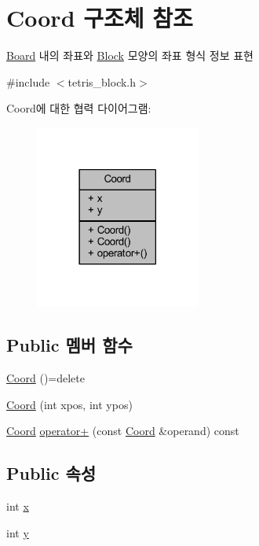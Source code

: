 \hypertarget{struct_coord}{}\section{Coord 구조체 참조}
\label{struct_coord}


\mbox{\hyperlink{class_board}{Board}} 내의 좌표와 \mbox{\hyperlink{class_block}{Block}} 모양의 좌표 형식 정보 표현  




{\ttfamily \#include $<$tetris\+\_\+block.\+h$>$}



Coord에 대한 협력 다이어그램\+:
\nopagebreak
\begin{figure}[H]
\begin{center}
\leavevmode
\includegraphics[width=153pt]{struct_coord__coll__graph}
\end{center}
\end{figure}
\subsection*{Public 멤버 함수}
\begin{DoxyCompactItemize}
\item 
\mbox{\hyperlink{struct_coord_a46e518631fa539ebb8a7f2a5b59fd483}{Coord}} ()=delete
\item 
\mbox{\hyperlink{struct_coord_ab01ff8e569cc417d7c669007e12a5fa1}{Coord}} (int xpos, int ypos)
\item 
\mbox{\hyperlink{struct_coord}{Coord}} \mbox{\hyperlink{struct_coord_ad564b77330c90986e1586d2d04aad6f9}{operator+}} (const \mbox{\hyperlink{struct_coord}{Coord}} \&operand) const
\end{DoxyCompactItemize}
\subsection*{Public 속성}
\begin{DoxyCompactItemize}
\item 
int \mbox{\hyperlink{struct_coord_a696eaa744360fc791d0e3b331c549dbe}{x}}
\item 
int \mbox{\hyperlink{struct_coord_a214166cca70cef7dda9201689c3e81ab}{y}}
\end{DoxyCompactItemize}



